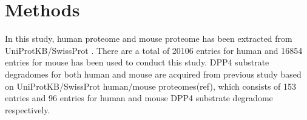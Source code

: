 \section{Methods}
In this study, human proteome and mouse proteome has been extracted from UniProtKB/SwissProt \cite{2007}. There are a total of 20106 entries for human and 16854 entries for mouse has been used to conduct this study. DPP4 substrate degradomes for both human and mouse are acquired from previous study based on UniProtKB/SwissProt human/mouse proteomes(ref), which consists of 153 entries and 96 entries for human and mouse DPP4 substrate degradome respectively. 

